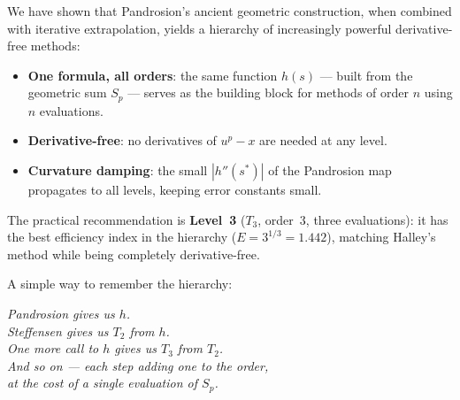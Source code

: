 \documentclass[11pt,a4paper]{article}
\theoremstyle{definition}
\begin{document}
We have shown that Pandrosion's ancient geometric construction, when combined with iterative extrapolation, yields a hierarchy of increasingly powerful derivative-free methods:

\begin{itemize}
  \item \textbf{One formula, all orders}: the same function $h(s)$ --- built from the geometric sum $S_p$ --- serves as the building block for methods of order $n$ using $n$ evaluations.
  \item \textbf{Derivative-free}: no derivatives of $u^p - x$ are needed at any level.
  \item \textbf{Curvature damping}: the small $|h''(s^*)|$ of the Pandrosion map propagates to all levels, keeping error constants small.
\end{itemize}

The practical recommendation is \textbf{Level~3} ($T_3$, order~$3$, three evaluations): it has the best efficiency index in the hierarchy ($E = 3^{1/3} = 1.442$), matching Halley's method while being completely derivative-free.

\medskip

A simple way to remember the hierarchy:
\begin{center}
\itshape
Pandrosion gives us $h$.\\
Steffensen gives us $T_2$ from $h$.\\
One more call to $h$ gives us $T_3$ from $T_2$.\\
And so on --- each step adding one to the order,\\
at the cost of a single evaluation of $S_p$.
\end{center}
\end{document}
